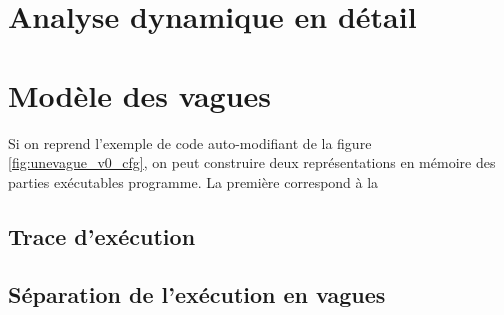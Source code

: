 
\section{Analyse dynamique en détail}

\section{Modèle des vagues}
Si on reprend l'exemple de code auto-modifiant de la figure \ref{fig:unevague_v0_cfg}, on peut construire deux représentations en mémoire des parties exécutables programme.
La première correspond à la 
\subsection{Trace d'exécution}
\subsection{Séparation de l'exécution en vagues}